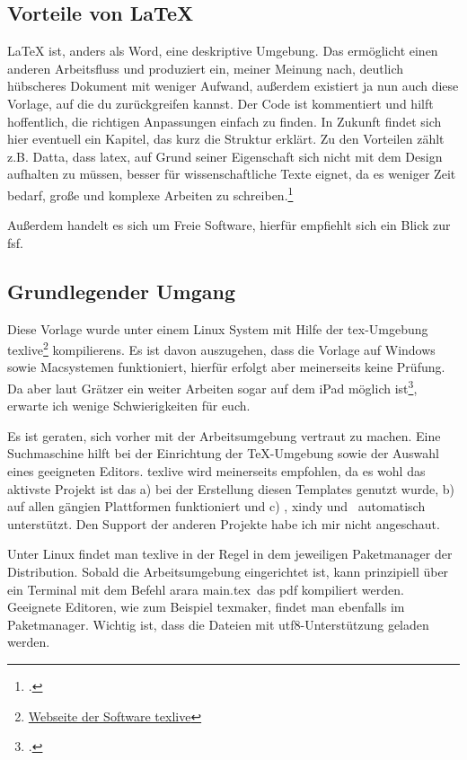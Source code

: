 \subsection{Vorteile von LaTeX}%
\label{sec:vort-von}
\LaTeX{} ist, anders als Word, eine deskriptive Umgebung. Das ermöglicht einen anderen Arbeitsfluss und produziert ein, meiner Meinung nach, deutlich hübscheres Dokument mit weniger Aufwand, außerdem existiert ja nun auch diese Vorlage, auf die du zurückgreifen kannst. Der Code ist kommentiert und hilft hoffentlich, die richtigen Anpassungen einfach zu finden. In Zukunft findet sich hier eventuell ein Kapitel, das kurz die Struktur erklärt.
Zu den Vorteilen zählt z.B. Datta, dass \gls{latex}, auf Grund seiner Eigenschaft sich nicht mit dem Design aufhalten zu müssen, besser für wissenschaftliche Texte eignet, da es weniger Zeit bedarf, große und komplexe Arbeiten zu schreiben.\footcite[Vgl. ][S. 1f.]{datta_latex_2017}

Außerdem handelt es sich um Freie Software, hierfür empfiehlt sich ein Blick zur \gls{fsf}.
\subsection{Grundlegender Umgang}
\label{sec:grundl}
Diese Vorlage wurde unter einem Linux System mit Hilfe der \gls{tex}-Umgebung texlive\footnote{\href{https://tug.org/texlive/}{Webseite der Software texlive}} \glspl{kompilieren}. Es ist davon auszugehen, dass die Vorlage auf Windows sowie Macsystemen funktioniert, hierfür erfolgt aber meinerseits keine Prüfung. Da aber laut Grätzer ein weiter Arbeiten sogar auf dem iPad möglich ist\footcite[Vgl. ][S. 179ff]{gratzer_practical_2014}, erwarte ich wenige Schwierigkeiten für euch.

Es ist geraten, sich vorher mit der Arbeitsumgebung vertraut zu machen. Eine Suchmaschine hilft bei der Einrichtung der TeX-Umgebung sowie der Auswahl eines geeigneten Editors. texlive wird meinerseits empfohlen, da es wohl das aktivste Projekt ist das a) bei der Erstellung diesen Templates genutzt wurde, b) auf allen gängien Plattformen funktioniert und c) \protect{}, xindy und \protect{}\ automatisch unterstützt. Den Support der anderen Projekte habe ich mir nicht angeschaut.

Unter Linux findet man texlive in der Regel in dem jeweiligen Paketmanager der Distribution. Sobald die Arbeitsumgebung eingerichtet ist, kann prinzipiell über ein Terminal mit dem Befehl \glqq arara main.tex\grqq\ das pdf kompiliert werden.
Geeignete Editoren, wie zum Beispiel texmaker, findet man ebenfalls im Paketmanager. Wichtig ist, dass die Dateien mit \gls{utf8}-Unterstützung geladen werden.

